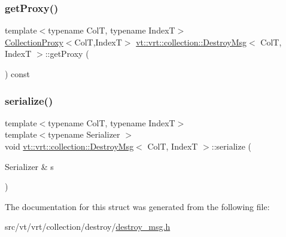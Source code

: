 \mbox{\label{structvt_1_1vrt_1_1collection_1_1_destroy_msg_a74511cc7aadebf60d6f0927fa88370ec}} 
\subsubsection{\texorpdfstring{get\+Proxy()}{getProxy()}}
{\footnotesize\ttfamily template$<$typename ColT, typename IndexT$>$ \\
\hyperlink{structvt_1_1vrt_1_1collection_1_1_collection_proxy}{Collection\+Proxy}$<$ColT,IndexT$>$ \hyperlink{structvt_1_1vrt_1_1collection_1_1_destroy_msg}{vt\+::vrt\+::collection\+::\+Destroy\+Msg}$<$ ColT, IndexT $>$\+::get\+Proxy (\begin{DoxyParamCaption}{ }\end{DoxyParamCaption}) const\hspace{0.3cm}{\ttfamily [inline]}}

\mbox{\label{structvt_1_1vrt_1_1collection_1_1_destroy_msg_a112e71fb4a34cf0229b78ad36aa4d4ef}} 
\subsubsection{\texorpdfstring{serialize()}{serialize()}}
{\footnotesize\ttfamily template$<$typename ColT, typename IndexT$>$ \\
template$<$typename Serializer $>$ \\
void \hyperlink{structvt_1_1vrt_1_1collection_1_1_destroy_msg}{vt\+::vrt\+::collection\+::\+Destroy\+Msg}$<$ ColT, IndexT $>$\+::serialize (\begin{DoxyParamCaption}\item[{Serializer \&}]{s }\end{DoxyParamCaption})\hspace{0.3cm}{\ttfamily [inline]}}



The documentation for this struct was generated from the following file\+:\begin{DoxyCompactItemize}
\item 
src/vt/vrt/collection/destroy/\hyperlink{destroy__msg_8h}{destroy\+\_\+msg.\+h}\end{DoxyCompactItemize}

